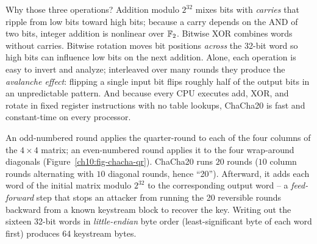 \begin{intuitionbox}
Why those three operations? Addition modulo $2^{32}$ mixes bits with \emph{carries} that ripple from low bits toward high bits; because a carry depends on the AND of two bits, integer addition is nonlinear over $\mathbb{F}_2$. Bitwise XOR combines words without carries. Bitwise rotation moves bit positions \emph{across} the 32-bit word so high bits can influence low bits on the next addition. Alone, each operation is easy to invert and analyze; interleaved over many rounds they produce the \emph{avalanche effect}: flipping a single input bit flips roughly half of the output bits in an unpredictable pattern. And because every CPU executes add, XOR, and rotate in fixed register instructions with no table lookups, ChaCha20 is fast and constant-time on every processor.
\end{intuitionbox}

An odd-numbered round applies the quarter-round to each of the four columns of the $4\times 4$ matrix; an even-numbered round applies it to the four wrap-around diagonals (Figure~\ref{ch10:fig-chacha-qr}). ChaCha20 runs $20$ rounds ($10$ column rounds alternating with $10$ diagonal rounds, hence ``20''). Afterward, it adds each word of the initial matrix modulo $2^{32}$ to the corresponding output word -- a \emph{feed-forward} step that stops an attacker from running the 20 reversible rounds backward from a known keystream block to recover the key. Writing out the sixteen 32-bit words in \emph{little-endian} byte order (least-significant byte of each word first) produces 64 keystream bytes.

